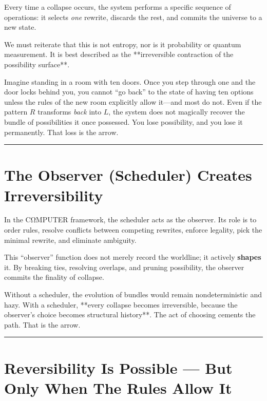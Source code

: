 Every time a collapse occurs, the system performs a specific sequence of operations: it selects \emph{one} rewrite, discards the rest, and commits the universe to a new state.

We must reiterate that this is not entropy, nor is it probability or quantum measurement. It is best described as the **irreversible contraction of the possibility surface**.

Imagine standing in a room with ten doors. Once you step through one and the door locks behind you, you cannot ``go back'' to the state of having ten options unless the rules of the new room explicitly allow it—and most do not. Even if the pattern $R$ transforms \emph{back} into $L$, the system does not magically recover the bundle of possibilities it once possessed. You lose possibility, and you lose it permanently. That loss is the arrow.

\begin{center}\rule{0.5\linewidth}{0.5pt}\end{center}

\section{\texorpdfstring{\textbf{The Observer (Scheduler) Creates Irreversibility}}{14.3 --- The Observer (Scheduler) Creates Irreversibility}}

In the CΩMPUTER framework, the scheduler acts as the observer. Its role is to order rules, resolve conflicts between competing rewrites, enforce legality, pick the minimal rewrite, and eliminate ambiguity.

This ``observer'' function does not merely record the worldline; it actively \textbf{shapes} it. By breaking ties, resolving overlaps, and pruning possibility, the observer commits the finality of collapse.

Without a scheduler, the evolution of bundles would remain nondeterministic and hazy. With a scheduler, **every collapse becomes irreversible, because the observer's choice becomes structural history**. The act of choosing cements the path. That is the arrow.

\begin{center}\rule{0.5\linewidth}{0.5pt}\end{center}

\section{\texorpdfstring{\textbf{Reversibility Is Possible --- But Only When The Rules Allow It}}{14.4 --- Reversibility Is Possible --- But Only When The Rules Allow It}}

